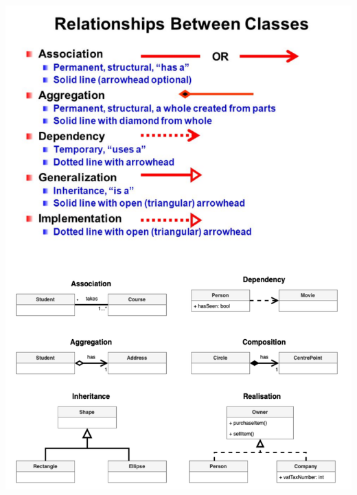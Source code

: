 \documentclass{article}
\begin{document}
\begin{enumerate}
\begin{center}
		\includegraphics[scale=0.5]{asss3}
	\end{center}
\end{enumerate}
\end{document}
